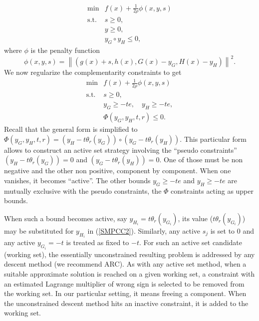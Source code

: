\documentclass[12pt]{article}
\newcommand{\pref}[1]{(\ref{#1})}
\begin{document}
{\begin{equation}\label{SMPCC}
 \begin{array}{ll} 
      \min &f(x)+\frac{1}{2\rho}\phi(x,y,s)\\
      \textrm{s.t.}
          &s\geq0,\\
          &y\geq0,\\
          &y_{G}\circ y_{H}\leq 0,
       \end{array}
\end{equation}
where $\phi$ is the penalty function  
\begin{displaymath}
\phi(x,y,s)=\left\|\left(g(x)+s,h(x),G(x)-y_{G},H(x)-y_{H}\right)\right\|^{2}.
\end{displaymath}
We now regularize the complementarity constraints to get
\begin{equation}\label{SMPCC2}
 \begin{array}{ll} 
      \min &f(x)+\frac{1}{2\rho}\phi(x,y,s)\\
      \textrm{s.t.}
          &s\geq0,\\
          &y_{G}\geq -te,\quad y_{H}\geq -te,\\
          &\Phi(y_{G},y_{H},t,r)\leq 0.
       \end{array}
\end{equation}
Recall that the general form is simplified to $\Phi(y_G,y_H,t,r) =  (y_H-t\theta_r(y_G))\circ(y_G-t\theta_r(y_H))$. This particular form allows to construct an active set strategy involving the ``pseudo constraints'' $(y_H-t\theta_r(y_G))=0$ and $(y_G-t\theta_r(y_H))=0$. One of those must be non negative and the other non positive, component by component. When one vanishes, it becomes ``active''. The other bounds $y_{G}\geq -te$ and $ y_{H}\geq -te$ are mutually exclusive with the pseudo constraints, the $\Phi$ constraints acting as upper bounds. 

When such a bound becomes active, say $y_{H_i}=t\theta_r(y_{G_i})$, its value ($t\theta_r(y_{G_i})$) may be substituted for $y_{H_i}$ in \pref{SMPCC2}. Similarly, any active $s_j$ is set to 0 and any active $y_{G_i}=-t$ is treated as fixed to $-t$. For such an active set candidate (working set), the essentially unconstrained resulting problem is addressed by any descent method (we recommend ARC). As with any active set method, when a suitable approximate solution is reached on a given working set, a constraint with an estimated Lagrange multiplier of wrong sign is selected to be removed from the working set. In our particular setting, it means freeing a component. When the unconstrained descent method hits an inactive constraint, it is added to the working set.

}
\end{document}
